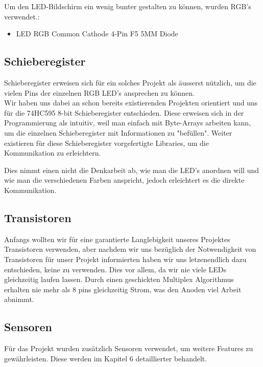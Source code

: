 \documentclass[12pt,a4paper]{article}
\begin{document}
Um den LED-Bildschirm ein wenig bunter gestalten zu können, wurden RGB's verwendet.:

\begin{itemize}
    \item LED RGB Common Cathode 4-Pin F5 5MM Diode
\end{itemize}

\subsection{Schieberegister}

Schieberegister erweisen sich für ein solches Projekt als äusserst nützlich, um die vielen Pins der einzelnen RGB LED's ansprechen zu können. \\

Wir haben uns dabei an schon bereits existierenden Projekten orientiert \cite{RGB LED Cube} und uns für die 74HC595 8-bit Schieberegister entschieden. Diese erweisen sich in der Programmierung als intuitiv, weil man einfach mit Byte-Arrays arbeiten kann, um die einzelnen Schieberegister mit Informationen zu "befüllen". Weiter existieren für diese Schieberegister vorgefertigte Libraries, um die Kommunikation zu erleichtern\cite{SPI}.

Dies nimmt einen nicht die Denkarbeit ab, wie man die LED's anordnen will und wie man die verschiedenen Farben anspricht, jedoch erleichtert es die direkte Kommunikation.

\subsection{Transistoren}

Anfangs wollten wir für eine garantierte Langlebigkeit unseres Projektes Transistoren verwenden, aber nachdem wir uns bezüglich der Notwendigkeit
von Transistoren für unser Projekt informierten haben wir uns letzenendlich dazu entschieden, keine zu verwenden. Dies vor allem, da wir nie viele LEDs gleichzeitig laufen lassen. Durch einen geschickten Multiplex Algorithmus erhalten nie mehr als 8 pins gleichzeitig Strom, was den Anoden viel Arbeit abnimmt.

\newpage

\subsection{Sensoren}

Für das Projekt wurden zusätzlich Sensoren verwendet, um weitere Features zu gewährleisten. Diese werden im Kapitel 6 detaillierter behandelt.
\end{document}
